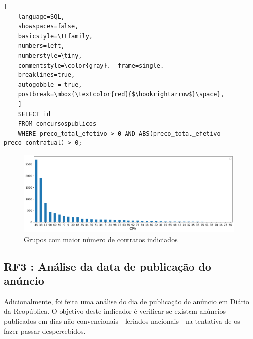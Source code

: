 \begin{lstlisting}[
	language=SQL,
	showspaces=false,
	basicstyle=\ttfamily,
	numbers=left,
	numberstyle=\tiny,
	commentstyle=\color{gray},	frame=single,
	breaklines=true,
	autogobble = true,
	postbreak=\mbox{\textcolor{red}{$\hookrightarrow$}\space},
	]
	SELECT id
	FROM concursospublicos 
	WHERE preco_total_efetivo > 0 AND ABS(preco_total_efetivo - preco_contratual) > 0;
\end{lstlisting}


\begin{figure}[H]
	\centering
	\includegraphics[width=\textwidth]{imagens/r059.png}
	\caption{Grupos com maior número de contratos indiciados}
	\label{}
\end{figure}



\subsection{RF3 : Análise da data de publicação do anúncio}

Adicionalmente, foi feita uma análise do dia de publicação do anúncio em Diário da Reopública. O objetivo deste indicador é verificar se existem anúncios publicados em dias não convencionais - feriados nacionais - na tentativa de os fazer passar despercebidos.


